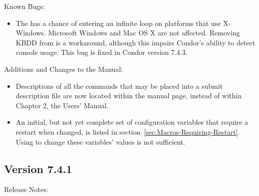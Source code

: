 \noindent Known Bugs:

\begin{itemize}

\item The  has a chance of entering an infinite loop
on platforms that use X-Windows.  Microsoft Windows and Mac OS X
are not affected.  Removing KBDD from  is a
workaround, although this impairs Condor's ability to detect
console usage.  This bug is fixed in Condor version 7.4.3.

\end{itemize}

\noindent Additions and Changes to the Manual:

\begin{itemize}

\item Descriptions of all the commands that may be placed into a
submit description file are now located within the 
manual page, instead of within Chapter 2, the Users' Manual.

\item An initial, but not yet complete set of configuration variables
that require a restart when changed,
is listed in section~\ref{sec:Macros-Requiring-Restart}.
Using  to change these variables' values is not sufficient.

\end{itemize}


\subsection*{\label{sec:New-7-4-1}Version 7.4.1}

\noindent Release Notes:

